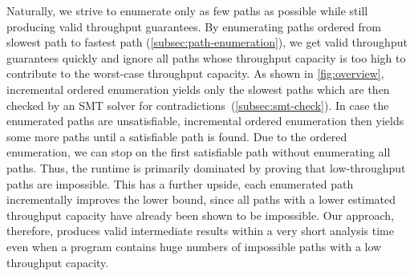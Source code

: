 \documentclass[sigconf,screen,authordraft]{acmart}
\begin{document}
Naturally, we strive to enumerate only as few paths as possible while still producing valid throughput guarantees.
By enumerating paths ordered from slowest path to fastest path (\ref{subsec:path-enumeration}), we get valid throughput guarantees quickly and ignore all paths whose throughput capacity is too high to contribute to the worst-case throughput capacity.
As shown in \ref{fig:overview}, incremental ordered enumeration yields only the slowest paths which are then checked by an \ac{SMT} solver for contradictions~(\ref{subsec:smt-check}).
In case the enumerated paths are unsatisfiable, incremental ordered enumeration then yields some more paths until a satisfiable path is found.
Due to the ordered enumeration, we can stop on the first satisfiable path without enumerating all paths.
Thus, the runtime is primarily dominated by proving that low-throughput paths are impossible.
This has a further upside, each enumerated path incrementally improves the lower bound, since all paths with a lower estimated throughput capacity have already been shown to be impossible.
Our approach, therefore, produces valid intermediate results within a very short analysis time even when a program contains huge numbers of impossible paths with a low throughput capacity.
\end{document}
